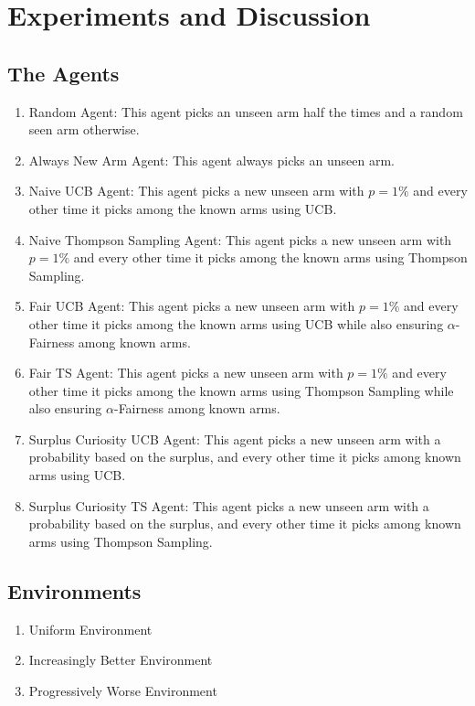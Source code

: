 \section{Experiments and Discussion}
 
\subsection{The Agents}

\begin{enumerate}
    \item Random Agent: This agent picks an unseen arm half the times and a random seen arm otherwise.
    \item Always New Arm Agent: This agent always picks an unseen arm.
    \item Naive UCB Agent: This agent picks a new unseen arm with $p=1\%$ and every other time it picks among the known arms using UCB.
    \item Naive Thompson Sampling Agent: This agent picks a new unseen arm with $p=1\%$ and every other time it picks among the known arms using Thompson Sampling.
    \item Fair UCB Agent: This agent picks a new unseen arm with $p=1\%$ and every other time it picks among the known arms using UCB while also ensuring $\alpha$-Fairness among known arms.
    \item Fair TS Agent: This agent picks a new unseen arm with $p=1\%$ and every other time it picks among the known arms using Thompson Sampling while also ensuring $\alpha$-Fairness among known arms.
    \item Surplus Curiosity UCB Agent: This agent picks a new unseen arm with a probability based on the surplus, and every other time it picks among known arms using UCB.
    \item Surplus Curiosity TS Agent: This agent picks a new unseen arm with a probability based on the surplus, and every other time it picks among known arms using Thompson Sampling.
\end{enumerate}

\subsection{Environments}

\begin{enumerate}
    \item Uniform Environment
    \item Increasingly Better Environment
    \item Progressively Worse Environment
\end{enumerate}

